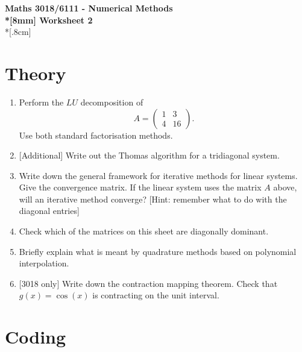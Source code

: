\documentclass[10pt]{article}
\begin{document}
\thispagestyle{empty}
\begin{center}
\textbf{\Large Maths 3018/6111 - Numerical Methods \\*[8mm]
Worksheet 2}\\*[.8cm]
\end{center}

\section*{Theory}

\begin{enumerate}
\item Perform the $LU$ decomposition of
  \begin{equation*}
    A =
    \begin{pmatrix}
      1 & 3 \\ 4 & 16
    \end{pmatrix}.
  \end{equation*}
  Use both standard factorisation methods.
\item{} [Additional] Write out the Thomas algorithm for a tridiagonal
  system.
\item Write down the general framework for iterative methods for
  linear systems. Give the convergence matrix. If the linear system
  uses the matrix $A$ above, will an iterative method converge? [Hint:
  remember what to do with the diagonal entries]
\item Check which of the matrices on this sheet are diagonally dominant.
\item Briefly explain what is meant by quadrature methods based on
  polynomial interpolation.
\item{} [3018 only] Write down the contraction mapping theorem. Check
  that $g(x) = \cos(x)$ is contracting on the unit interval.
\end{enumerate}

\section*{Coding}
\end{document}
